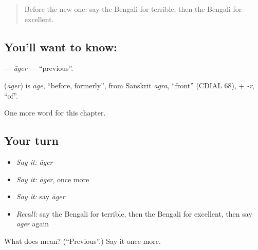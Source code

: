 \label{lesson:BN-C220-ager}



\begin{quote}
Before the new one: say the Bengali for terrible, then the Bengali for excellent.
\end{quote}

\subsection*{You'll want to know: }
\textbf{} — \emph{āger} — \textquotedblleft{}previous\textquotedblright{}.

\begin{cousinweb}
\textbf{} (\emph{āger}) is \emph{āge}, \textquotedblleft{}before, formerly\textquotedblright{}, from Sanskrit \emph{agra}, \textquotedblleft{}front\textquotedblright{} (CDIAL 68), + \emph{-r}, \textquotedblleft{}of\textquotedblright{}.
\end{cousinweb}

\begin{grammarlens}[title={What you've built}]
One more word for this chapter.
\end{grammarlens}

\subsection*{Your turn}
\begin{itemize}
\raggedright
  \item \emph{Say it:} \emph{āger}
  \item \emph{Say it:} \emph{āger}, once more
  \item \emph{Say it:} say \emph{āger}
  \item \emph{Recall:} say the Bengali for terrible, then the Bengali for excellent, then say \emph{āger} again
\end{itemize}

\begin{tcolorbox}[breakable,colback=teal!4,colframe=teal!35!black,title={Before you move on}]
What does  mean? (\textquotedblleft{}Previous\textquotedblright{}.) Say it once more.
\end{tcolorbox}
